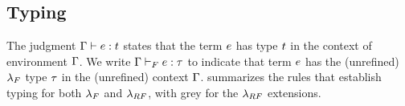 %

\subsection{Typing}
\label{sec:typing:typ}

The judgment ${\mathrm{\Gamma}} \vdash {\ensuremath{e}} : {t}$ states
that the term $e$ has type $t$ in the context of
environment $\mathrm{\Gamma}$.
%
We write ${\mathrm{\Gamma}} \vdash_F {e} : {\tau}$
to indicate that term $e$ has the (unrefined)
$\lambda_{F}$ type $\tau$ in the (unrefined) context
$\mathrm{\Gamma}$.
%
 summarizes
the rules that establish typing for both $\lambda_{F}$ and
$\lambda_{RF}$, with grey %
for the $\lambda_{RF}$ extensions.

